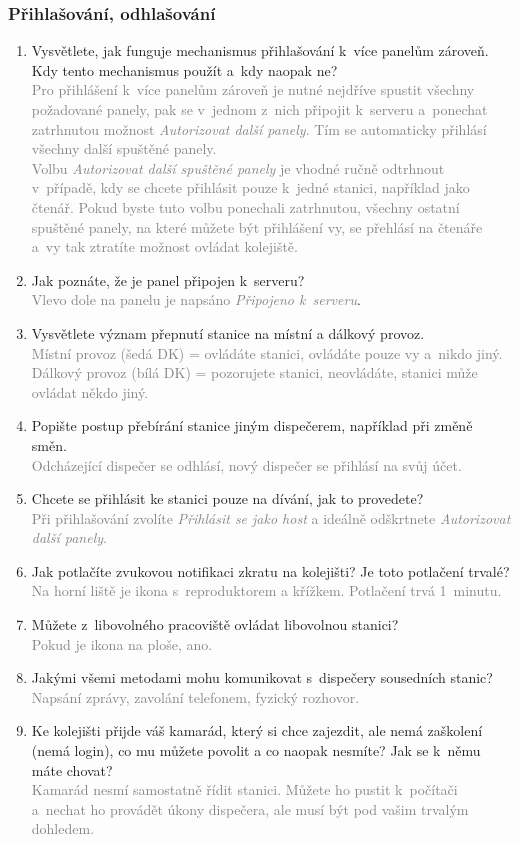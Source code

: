 \documentclass[12pt,a4paper]{article}
\newcommand{\solution}[1]{\\ \textcolor{gray}{#1}}
\newcommand{\solution}[1]{}
\begin{document}
\subsubsection*{Přihlašování, odhlašování}
\begin{enumerate}[leftmargin=*]

\item Vysvětlete, jak funguje mechanismus přihlašování k~více panelům zároveň.
Kdy tento mechanismus použít a~kdy naopak ne?
\solution{Pro přihlášení k~více panelům zároveň je nutné nejdříve spustit
všechny požadované panely, pak se v~jednom z~nich připojit k~serveru a~ponechat
zatrhnutou možnost \textit{Autorizovat další panely}. Tím se automaticky
přihlásí všechny další spuštěné panely. \\ Volbu \textit{Autorizovat další
spuštěné panely} je vhodné ručně odtrhnout v~případě, kdy se chcete přihlásit
pouze k~jedné stanici, například jako čtenář. Pokud byste tuto volbu ponechali
zatrhnutou, všechny ostatní spuštěné panely, na které můžete být přihlášení vy,
se přehlásí na čtenáře a~vy tak ztratíte možnost ovládat kolejiště.}

\item Jak poznáte, že je panel připojen k~serveru?
\solution{Vlevo dole na panelu je napsáno \textit{Připojeno k~serveru}}.

\item Vysvětlete význam přepnutí stanice na místní a dálkový provoz.
\solution{Místní provoz (šedá DK) = ovládáte stanici, ovládáte pouze vy a~nikdo
jiný. Dálkový provoz (bílá DK) = pozorujete stanici, neovládáte, stanici může
ovládat někdo jiný.}

\item Popište postup přebírání stanice jiným dispečerem, například při změně
směn.
\solution{Odcházející dispečer se odhlásí, nový dispečer se přihlásí na svůj
účet.}

\item Chcete se přihlásit ke stanici pouze na dívání, jak to provedete?
\solution{Při přihlašování zvolíte \textit{Přihlásit se jako host} a ideálně
odškrtnete \textit{Autorizovat další panely}.}

\item Jak potlačíte zvukovou notifikaci zkratu na kolejišti? Je toto
potlačení trvalé?
\solution{Na horní liště je ikona s~reproduktorem a křížkem. Potlačení trvá
1~minutu.}

\item Můžete z~libovolného pracoviště ovládat libovolnou stanici?
\solution{Pokud je ikona na ploše, ano.}

\item Jakými všemi metodami mohu komunikovat s~dispečery sousedních stanic?
\solution{Napsání zprávy, zavolání telefonem, fyzický rozhovor.}

\item Ke kolejišti přijde váš kamarád, který si chce zajezdit, ale nemá
zaškolení (nemá login), co mu můžete povolit a co naopak nesmíte? Jak se k~němu
máte chovat?
\solution{Kamarád nesmí samostatně řídit stanici. Můžete ho pustit k~počítači
a~nechat ho provádět úkony dispečera, ale musí být pod vašim trvalým dohledem.}

\end{enumerate}
\end{document}
